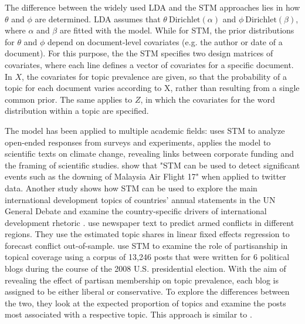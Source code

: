 \documentclass[12pt,a4paper,notitlepage]{article}
\begin{document}
The difference between the widely used LDA and the STM approaches lies in how $\theta$ and $\phi$ are determined. LDA assumes that $\theta ~ \text{Dirichlet}(\alpha)$ and $\phi ~ \text{Dirichlet}(\beta)$, where $\alpha$ and $\beta$ are fitted with the model. While for STM, the prior distributions for $\theta$ and $\phi$ depend on document-level covariates (e.g. the author or date of a document). For this purpose, the the STM specifies two design matrices of covariates, where each line defines a vector of covariates for a specific document.  In $X$, the covariates for topic prevalence are given, so that the probability of a topic for each document varies according to X, rather than resulting from a single common prior. The same applies to $Z$, in which the covariates for the word distribution within a topic are specified. 

The model has been applied to multiple academic fields: \citet{roberts_structural_2014} uses STM to analyze open-ended responses from surveys and experiments, \citet{farrell_corporate_2016} applies the model to scientific texts on climate change, revealing links between corporate funding and the framing of scientific studies. \citet{mishler_using_2015} show that "STM can be used to detect significant events such as the downing of Malaysia Air Flight 17" when applied to twitter data. Another study shows how STM can be used to explore the main international development topics of countries' annual statements in the UN General Debate and examine the country-specific drivers of international development rhetoric \citep{baturo_what_2017}. \citet{mueller_reading_2016} use newspaper text to predict armed conflicts in different regions. They use the estimated topic shares in linear fixed effects regression to forecast conflict out-of-sample. \citet{roberts_navigating_2016} use STM to examine the role of partisanship in topical coverage using a corpus of 13,246 posts that were written for 6 political blogs during the course of the 2008 U.S. presidential election. With the aim of revealing the effect of partisan membership on topic prevalence, each blog is assigned to be either liberal or conservative. To explore the differences between the two, they look at the expected proportion of topics and examine the posts most associated with a respective topic. This approach is similar to \citet{roberts_model_2016}. 
\end{document}

